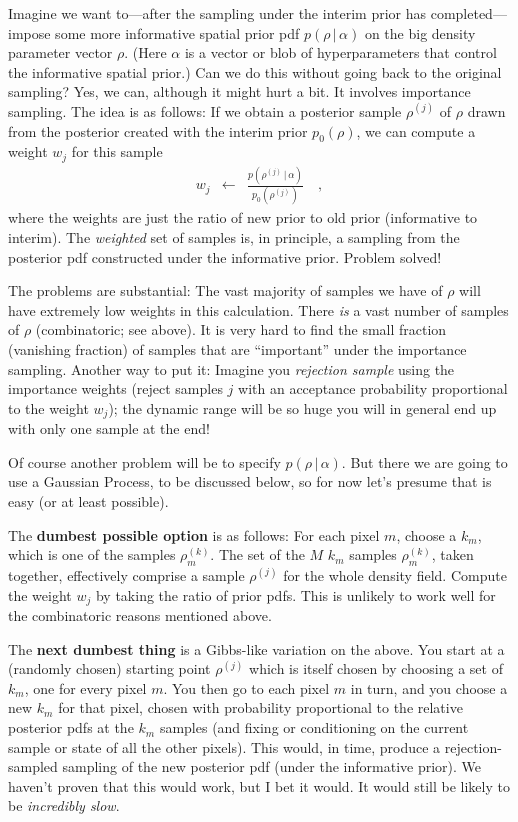 \documentclass[12pt, letterpaper]{article}
\newcommand{\given}{\,|\,}
\begin{document}
Imagine we want to---after the sampling under the interim prior has completed---%
  impose some more informative spatial prior pdf $p(\rho\given\alpha)$
  on the big density parameter vector $\rho$.
(Here $\alpha$ is a vector or blob of hyperparameters that control the informative spatial prior.)
Can we do this without going back to the original sampling?
Yes, we can, although it might hurt a bit.
It involves importance sampling.
The idea is as follows:
If we obtain a posterior sample $\rho^{(j)}$ of $\rho$ drawn from the posterior
  created with the interim prior $p_0(\rho)$,
  we can compute a weight $w_j$ for this sample
\begin{eqnarray}
w_j & \leftarrow & \frac{p(\rho^{(j)}\given\alpha)}{p_0(\rho^{(j)})}
\quad,
\end{eqnarray}
  where the weights are just the ratio of new prior to old prior (informative to interim).
The \emph{weighted} set of samples is, in principle,
  a sampling from the posterior pdf constructed under the informative prior.
Problem solved!

The problems are substantial:
The vast majority of samples we have of $\rho$ will have extremely low weights in this calculation.
There \emph{is} a vast number of samples of $\rho$ (combinatoric; see above).
It is very hard to find the small fraction (vanishing fraction) of samples that are ``important''
  under the importance sampling.
Another way to put it:
Imagine you \emph{rejection sample} using the importance weights
  (reject samples $j$ with an acceptance probability proportional to the weight $w_j$);
  the dynamic range will be so huge you will in general end up with only one sample at the end!

Of course another problem will be to specify $p(\rho\given\alpha)$.
But there we are going to use a Gaussian Process,
  to be discussed below,
  so for now let's presume that is easy (or at least possible).

The \textbf{dumbest possible option} is as follows:
For each pixel $m$, choose a $k_m$, which is one of the samples $\rho_m^{(k)}$.
The set of the $M$ $k_m$ samples $\rho_m^{(k)}$, taken together,
  effectively comprise a sample $\rho^{(j)}$ for the whole density field.
Compute the weight $w_j$ by taking the ratio of prior pdfs.
This is unlikely to work well for the combinatoric reasons mentioned above.

The \textbf{next dumbest thing} is a Gibbs-like variation on the above.
You start at a (randomly chosen) starting point $\rho^{(j)}$ which is itself
  chosen by choosing a set of $k_m$, one for every pixel $m$.
You then go to each pixel $m$ in turn, and you choose a new $k_m$ for that pixel,
  chosen with probability proportional to the relative posterior pdfs at the $k_m$ samples
  (and fixing or conditioning on the current sample or state of all the other pixels).
This would, in time, produce a rejection-sampled sampling of the new posterior pdf
  (under the informative prior).
We haven't proven that this would work, but I bet it would.
It would still be likely to be \emph{incredibly slow}.
\end{document}
